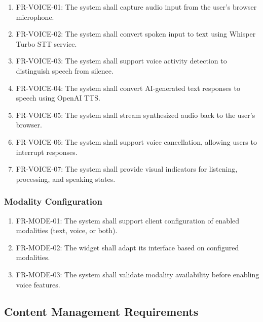 \begin{enumerate}[leftmargin=*]
    \item FR-VOICE-01: The system shall capture audio input from the user's browser microphone.
    \item FR-VOICE-02: The system shall convert spoken input to text using Whisper Turbo STT service.
    \item FR-VOICE-03: The system shall support voice activity detection to distinguish speech from silence.
    \item FR-VOICE-04: The system shall convert AI-generated text responses to speech using OpenAI TTS.
    \item FR-VOICE-05: The system shall stream synthesized audio back to the user's browser.
    \item FR-VOICE-06: The system shall support voice cancellation, allowing users to interrupt responses.
    \item FR-VOICE-07: The system shall provide visual indicators for listening, processing, and speaking states.
\end{enumerate}

\subsubsection{Modality Configuration}

\begin{enumerate}[leftmargin=*]
    \item FR-MODE-01: The system shall support client configuration of enabled modalities (text, voice, or both).
    \item FR-MODE-02: The widget shall adapt its interface based on configured modalities.
    \item FR-MODE-03: The system shall validate modality availability before enabling voice features.
\end{enumerate}

\subsection{Content Management Requirements}

